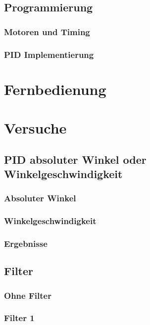\documentclass[12pt,a4paper, ngerman]{article}
\begin{document}
\subsection{Programmierung}

\subsubsection{Motoren und Timing}

\subsubsection{PID Implementierung}

\section{Fernbedienung}

\section{Versuche}

\subsection{PID absoluter Winkel oder Winkelgeschwindigkeit}

\subsubsection{Absoluter Winkel}

\subsubsection{Winkelgeschwindigkeit}

\subsubsection{Ergebnisse}

\subsection{Filter}

\subsubsection{Ohne Filter}

\subsubsection{Filter 1}
\end{document}
